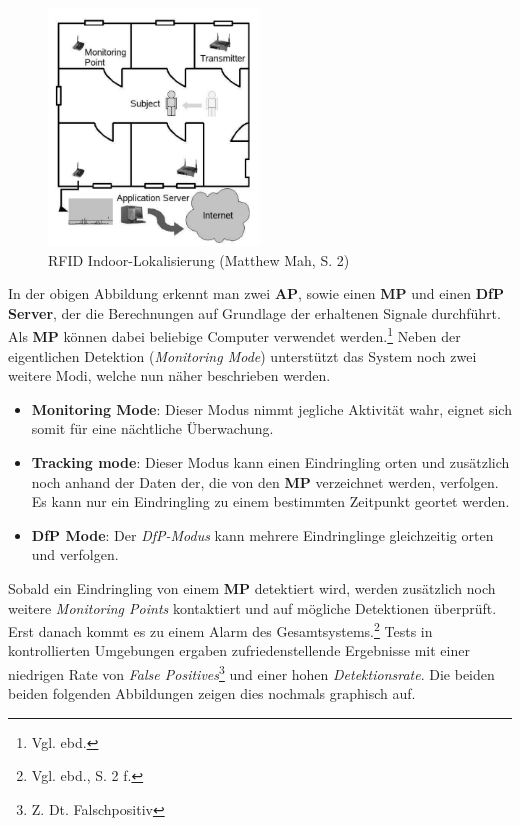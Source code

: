 \begin{figure}[H]
	\centering
	\includegraphics[width=0.5\textwidth]{pictures/rfid}
	\caption{RFID Indoor-Lokalisierung (Matthew Mah, S. 2)}
\end{figure}

In der obigen Abbildung erkennt man zwei \textbf{AP}, sowie einen \textbf{MP} und einen \textbf{DfP Server}, der die Berechnungen auf Grundlage der erhaltenen Signale durchführt. Als \textbf{MP} können dabei beliebige Computer verwendet werden.\footnote{Vgl. ebd.} Neben der eigentlichen Detektion (\textit{Monitoring Mode}) unterstützt das System noch zwei weitere Modi, welche nun näher beschrieben werden.\\

\begin{itemize}
\item \textbf{Monitoring Mode}: Dieser Modus nimmt jegliche Aktivität wahr, eignet sich somit für eine nächtliche Überwachung.
\item \textbf{Tracking mode}: Dieser Modus kann einen Eindringling orten und zusätzlich noch anhand der Daten der, die von den \textbf{MP} verzeichnet werden, verfolgen. Es kann nur ein Eindringling zu einem bestimmten Zeitpunkt geortet werden.
\item \textbf{DfP Mode}: Der \textit{DfP-Modus} kann mehrere Eindringlinge gleichzeitig orten und verfolgen.
\end{itemize}

Sobald ein Eindringling von einem \textbf{MP} detektiert wird, werden zusätzlich noch weitere \textit{Monitoring Points} kontaktiert und auf mögliche Detektionen überprüft. Erst danach kommt es zu einem Alarm des Gesamtsystems.\footnote{Vgl. ebd., S. 2 f.} Tests in kontrollierten Umgebungen ergaben zufriedenstellende Ergebnisse mit einer niedrigen Rate von \textit{False Positives}\footnote{Z. Dt. Falschpositiv} und einer hohen \textit{Detektionsrate}. Die beiden beiden folgenden Abbildungen zeigen dies nochmals graphisch auf.

